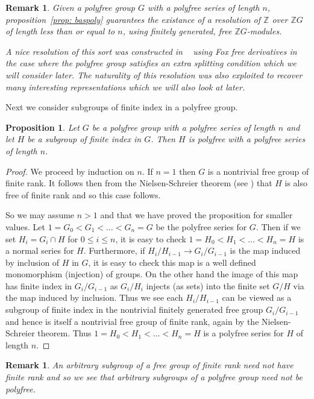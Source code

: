 \documentclass{amsart}
\newtheorem{prop}[thm]{Proposition}
\newtheorem{rem}[thm]{Remark}
\begin{document}
\begin{rem}
Given a polyfree group $G$ with a polyfree series of length $n$, 
proposition~\ref{prop: baspoly} guarantees the existance of a resolution of
$\mathbb{Z}$ over $\mathbb{Z}G$ of length less than or equal to $n$,
using finitely generated, free $\mathbb{Z}G$-modules.

A nice resolution of this sort 
was constructed in ~\cite{Dan} using Fox free derivatives
in the case where the polyfree group satisfies an extra splitting condition
which we will consider later. The naturality of this resolution was also
exploited to recover many interesting representations which we will
also look at later.
\end{rem}

Next we consider subgroups of finite index in a polyfree group.

\begin{prop}
\label{prop: polyfin}
Let $G$ be a polyfree group with a polyfree series of length $n$ and
let $H$ be a subgroup of finite index in $G$. Then $H$ is polyfree
with a polyfree series of length $n$.
\end{prop}
\begin{proof}
We proceed by induction on $n$. If $n=1$ then $G$ is a nontrivial free group
of finite rank. It follows then from the Nielsen-Schreier theorem 
(see \cite{Robin}) that
$H$ is also free of finite rank and so this case follows.

So we may assume $n > 1$ and that we have proved the proposition for smaller
values. Let $1 = G_0 < G_1 < \dots < G_n =G$ be the polyfree series for $G$.
Then if we set $H_i=G_i \cap H$ for $0 \leq i \leq n$, it is easy to check
$1=H_0 < H_1 < \dots <H_n=H$ is a normal series for $H$. Furthermore,
if $H_i/H_{i-1} \rightarrow G_i/G_{i-1}$ is the map induced by inclusion
of $H$ in $G$, it is easy to check this map is a well defined monomorphism
(injection) of groups. On the other hand the image of this map has finite index
in $G_i/G_{i-1}$ as $G_i/H_i$ injects (as sets) into the finite set $G/H$ 
via the map induced by inclusion. Thus we see each $H_i/H_{i-1}$ can be
viewed as a subgroup of finite index in the nontrivial finitely generated 
free group
$G_i/G_{i-1}$ and hence is itself a nontrivial free group of finite rank,
again by the Nielsen-Schreier theorem. 
Thus $1=H_0 < H_1 < \dots <H_n=H$ is a polyfree series for
$H$ of length $n$.
\end{proof}

\begin{rem}
An arbitrary subgroup of a free group of finite rank need not have finite rank
and so we see that arbitrary subgroups of a polyfree group need not be
polyfree.
\end{rem}
\end{document}
